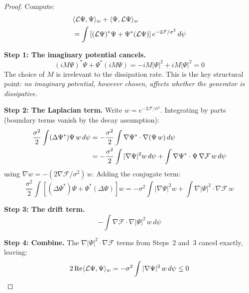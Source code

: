 \documentclass[12pt]{article}
\newcommand{\Fcal}{\mathcal{F}}
\newcommand{\Lcal}{\mathcal{L}}
\begin{document}
\begin{proof}
Compute:
\begin{align}
    &\langle \Lcal\Psi, \Psi\rangle_w + \langle \Psi, \Lcal\Psi\rangle_w \notag \\
    &= \int \left[(\Lcal\Psi)^*\Psi + \Psi^*(\Lcal\Psi)\right] e^{-2\Fcal/\sigma^2}\, d\psi
\end{align}

\textbf{Step 1: The imaginary potential cancels.}
\begin{equation}
    (iM\Psi)^*\Psi + \Psi^*(iM\Psi) = -iM|\Psi|^2 + iM|\Psi|^2 = 0
\end{equation}
The choice of $M$ is irrelevant to the dissipation rate. This is the key structural point: \textit{no imaginary potential, however chosen, affects whether the generator is dissipative.}

\textbf{Step 2: The Laplacian term.} Write $w = e^{-2\Fcal/\sigma^2}$. Integrating by parts (boundary terms vanish by the decay assumption):
\begin{align}
    \frac{\sigma^2}{2}\int (\Delta\Psi^*)\Psi\, w\, d\psi
    &= -\frac{\sigma^2}{2}\int \nabla\Psi^* \cdot \nabla(\Psi\, w)\, d\psi \notag \\
    &= -\frac{\sigma^2}{2}\int |\nabla\Psi|^2 w\, d\psi + \int \nabla\Psi^* \cdot \Psi\, \nabla\Fcal\, w\, d\psi
\end{align}
using $\nabla w = -(2\nabla\Fcal/\sigma^2)\,w$. Adding the conjugate term:
\begin{equation}
    \frac{\sigma^2}{2}\int \left[(\Delta\Psi^*)\Psi + \Psi^*(\Delta\Psi)\right] w = -\sigma^2\!\int |\nabla\Psi|^2 w + \int \nabla|\Psi|^2\cdot\nabla\Fcal\, w
\end{equation}

\textbf{Step 3: The drift term.}
\begin{equation}
    -\int \nabla\Fcal\cdot\nabla|\Psi|^2\, w\, d\psi
\end{equation}

\textbf{Step 4: Combine.} The $\nabla|\Psi|^2\cdot\nabla\Fcal$ terms from Steps~2 and~3 cancel exactly, leaving:
\begin{equation}
    2\,\mathrm{Re}\langle \Lcal\Psi, \Psi\rangle_w = -\sigma^2 \int |\nabla\Psi|^2\, w\, d\psi \leq 0 \qedhere
\end{equation}
\end{proof}
\end{document}
